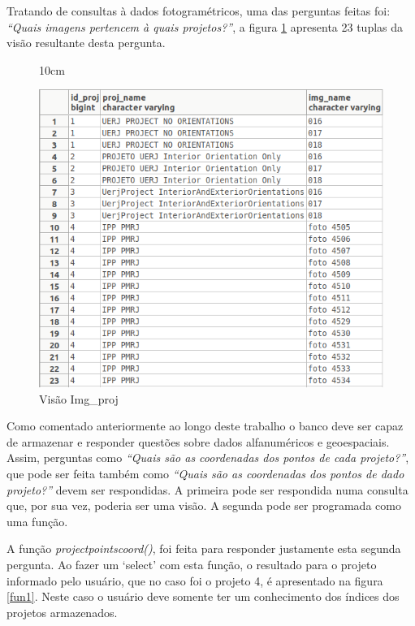 Tratando de consultas à dados fotogramétricos, uma das perguntas feitas foi: \textit{``Quais imagens pertencem à quais projetos?''}, a figura \ref{img_proj}  apresenta 23 tuplas da visão resultante desta pergunta.
\begin{figure}[!ht]{10cm}
  \caption{Visão Img\_proj} \label{img_proj}
  \centering
  \includegraphics[width=1\hsize]{figuras/img_proj.png}
\end{figure}

Como comentado anteriormente ao longo deste trabalho o banco deve ser capaz de armazenar e responder questões sobre dados alfanuméricos e geoespaciais. Assim, perguntas como \textit{``Quais são as coordenadas dos pontos de cada projeto?''}, que pode ser feita também como \textit{``Quais são as coordenadas dos pontos de dado projeto?''} devem ser respondidas. A primeira pode ser respondida numa consulta que, por sua vez, poderia ser uma visão. A segunda pode ser programada como uma função. 

A função \textit{projectpointscoord()}, foi feita para responder justamente esta segunda pergunta. Ao fazer um `select' com esta função, o resultado para o projeto informado pelo usuário, que no caso foi o projeto 4, é apresentado na figura \ref{fun1}. Neste caso o usuário deve somente ter um conhecimento dos índices dos projetos armazenados.

